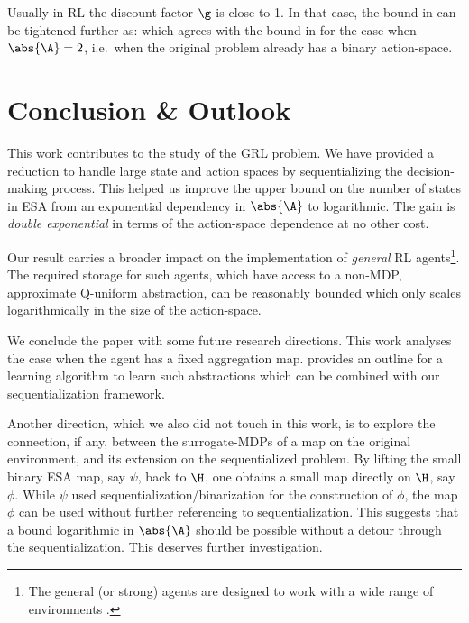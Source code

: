 \documentclass{article} %
\begin{document}
Usually in RL the discount factor $\g$ is close to 1. In that case, the bound in  can be tightened further as:
\beq
\abs{\S} \lesssim {}
\eeq
which agrees with the bound in  for the case when $\abs{\A} = 2$, i.e.\ when the original problem already has a binary action-space.

\section{Conclusion \& Outlook}\label{sec:conclusion}
\vspace{-0.94mm}

This work contributes to the study of the GRL problem. We have provided a reduction to handle large state and action spaces by sequentializing the decision-making process.
This helped us improve the upper bound on the number of states in ESA from an exponential dependency in $\abs{\A}$ to logarithmic. The gain is \emph{double exponential} in terms of the action-space dependence at no other cost.

Our result carries a broader impact on the implementation of \emph{general} RL agents\footnote{The general (or strong) agents are designed to work with a wide range of environments \cite{Hutter2000}.}. The required storage for such agents, which have access to a non-MDP, approximate Q-uniform abstraction, can be reasonably bounded which only scales logarithmically in the size of the action-space.

We conclude the paper with some future research directions. This work analyses the case when the agent has a fixed aggregation map. \citet{Hutter2016} provides an outline for a learning algorithm to learn such abstractions which can be combined with our sequentialization framework.

Another direction, which we also did not touch in this work, is to explore the connection, if any, between the surrogate-MDPs of a map on the original environment, and its extension on the sequentialized problem. By lifting the small binary ESA map, say $\psi$, back to $\H$, one obtains a small map directly on $\H$, say $\phi$. While $\psi$ used sequentialization/binarization for the construction of $\phi$, the map $\phi$ can be used without further referencing to sequentialization. This suggests that a bound logarithmic in $\abs{\A}$ should be possible without a detour through the sequentialization. This deserves further investigation.
\end{document}
